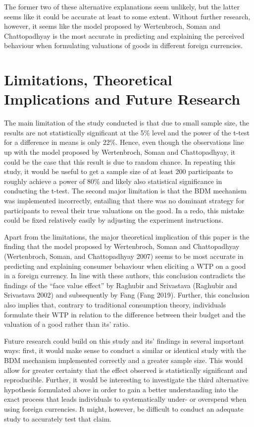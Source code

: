 \documentclass[
]{report}
\begin{document}
The former two of these alternative explanations seem unlikely, but the
latter seems like it could be accurate at least to some extent. Without
further research, however, it seems like the model proposed by
Wertenbroch, Soman and Chattopadhyay is the most accurate in predicting
and explaining the perceived behaviour when formulating valuations of
goods in different foreign currencies.

\section{Limitations, Theoretical Implications and Future
Research}\label{limitations-theoretical-implications-and-future-research}

The main limitation of the study conducted is that due to small sample
size, the results are not statistically significant at the 5\% level and
the power of the t-test for a difference in means is only 22\%. Hence,
even though the observations line up with the model proposed by
Wertenbroch, Soman and Chattopadhyay, it could be the case that this
result is due to random chance. In repeating this study, it would be
useful to get a sample size of at least 200 participants to roughly
achieve a power of 80\% and likely also statistical significance in
conducting the t-test. The second major limitation is that the BDM
mechanism was implemented incorrectly, entailing that there was no
dominant strategy for participants to reveal their true valuations on
the good. In a redo, this mistake could be fixed relatively easily by
adjusting the experiment instructions.

Apart from the limitations, the major theoretical implication of this
paper is the finding that the model proposed by Wertenbroch, Soman and
Chattopadhyay (Wertenbroch, Soman, and Chattopadhyay 2007) seems to be
most accurate in predicting and explaining consumer behaviour when
eliciting a WTP on a good in a foreign currency. In line with these
authors, this conclusion contradicts the findings of the ``face value
effect'' by Raghubir and Srivastava (Raghubir and Srivastava 2002) and
subsequently by Fang (Fang 2019). Further, this conclusion also implies
that, contrary to traditional consumption theory, individuals formulate
their WTP in relation to the difference between their budget and the
valuation of a good rather than its' ratio.

Future research could build on this study and its' findings in several
important ways: first, it would make sense to conduct a similar or
identical study with the BDM mechanism implemented correctly and a
greater sample size. This would allow for greater certainty that the
effect observed is statistically significant and reproducible. Further,
it would be interesting to investigate the third alternative hypothesis
formulated above in order to gain a better understanding into the exact
process that leads individuals to systematically under- or overspend
when using foreign currencies. It might, however, be difficult to
conduct an adequate study to accurately test that claim.
\end{document}
